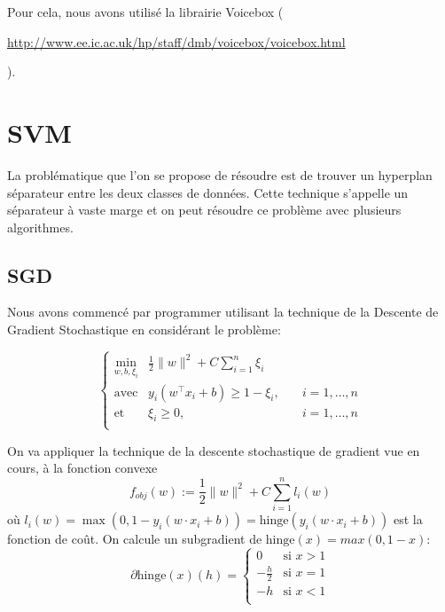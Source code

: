 \documentclass{article}
\let\urlorig\url
\renewcommand{\url}[1]{%
  \begin{otherlanguage}{english}\urlorig{#1}\end{otherlanguage}%
}
\begin{document}
Pour cela, nous avons utilisé la librairie Voicebox (\url{http://www.ee.ic.ac.uk/hp/staff/dmb/voicebox/voicebox.html}).
\section{SVM}
\label{svm}
La problématique que l'on se propose de résoudre est de trouver un hyperplan séparateur entre les deux classes de données. Cette technique s'appelle un séparateur à vaste marge et on peut résoudre ce problème avec plusieurs algorithmes.
\subsection{SGD}
\label{sgd}
Nous avons commencé par programmer utilisant la technique de la Descente de Gradient Stochastique en considérant le problème:

\begin{equation}
\label{eq:primalSVM}
  \left\{
    \begin{array} {lll}
      \displaystyle\min_{w,b,\xi_i} & \frac{1}{2} \|w\|^2 + C\displaystyle\sum\limits_{i=1}^{n}\xi_i&\\
      \mbox{avec} &y_i(w^\top  x_i+b) \geq 1 - \xi_i,\quad & i=1,\dots ,n  \\
      \mbox{et} &\xi_i \geq 0 , &i=1,\dots ,n  \\
    \end{array}
  \right.
\end{equation}

On va appliquer la technique de la descente stochastique de gradient vue en cours, à la fonction convexe
\[ f_{obj}(w) := \frac{1}{2} \|w\|^2 + C\displaystyle\sum\limits_{i=1}^{n}l_i(w) \]
où $l_i(w) = \max (0, 1 - y_i (w \cdot x_i + b)) = \mathrm{hinge}(y_i (w \cdot x_i + b))$ est la fonction de coût.
On calcule un subgradient de $\mathrm{hinge}(x) = max(0,1-x)$:
\[ \partial \mathrm{hinge}(x)(h) = \begin{cases} 0 &\mbox{si } x>1 \\
-\frac{h}{2} & \mbox{si } x=1\\
-h & \mbox{si } x<1\\
 \end{cases}\]
 
\end{document}
